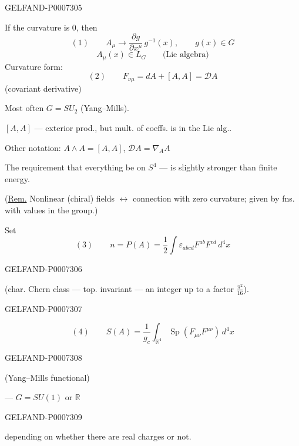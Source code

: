 \begin{GelfandAdjacentEvidence}{GELFAND-P000730}{5}


If the curvature is 0, then
\[
(1)\qquad A_\mu\longrightarrow\frac{\partial g}{\partial x^\mu}\,g^{-1}(x),
\qquad g(x)\in G
\]
\[
A_\mu(x)\in L_G\qquad\text{(Lie algebra)}
\]
Curvature form:
\[
(2)\qquad F_{\nu\mu}=dA+[A,A]=\mathcal D A
\]
(covariant derivative)

Most often \(G=SU_2\) (Yang--Mills).

\([A,A]\) --- exterior prod., but mult. of coeffs. is in the Lie alg..

Other notation: \(A\wedge A=[A,A]\), \(\mathcal D A=\nabla_A A\)

The requirement that everything be on \(S^4\) --- is slightly stronger than finite energy.

(\underline{Rem.} Nonlinear (chiral) fields \(\leftrightarrow\) connection with zero curvature;
given by fns. with values in the group.)

Set
\[
(3)\qquad n=P(A)=\frac12\int\varepsilon_{abcd}F^{ab}F^{cd}\,d^4x
\]
\end{GelfandAdjacentEvidence}
\begin{GelfandAdjacentEvidence}{GELFAND-P000730}{6}

(char. Chern class --- top. invariant --- an integer up to a factor \(\frac{\pi^2}{16}\)).
\end{GelfandAdjacentEvidence}
\begin{GelfandAdjacentEvidence}{GELFAND-P000730}{7}


\[
(4)\qquad S(A)=\frac1{g_c}\int_{\mathbb R^4}
       \operatorname{Sp}(F_{\mu\nu}F^{\mu\nu})\,d^4x
\]
\end{GelfandAdjacentEvidence}
\begin{GelfandAdjacentEvidence}{GELFAND-P000730}{8}

(Yang--Mills functional)

 --- \(G=SU(1)\) or \(\mathbb R\)
\end{GelfandAdjacentEvidence}
\begin{GelfandAdjacentEvidence}{GELFAND-P000730}{9}


depending on whether there are real charges or not.
\end{GelfandAdjacentEvidence}


